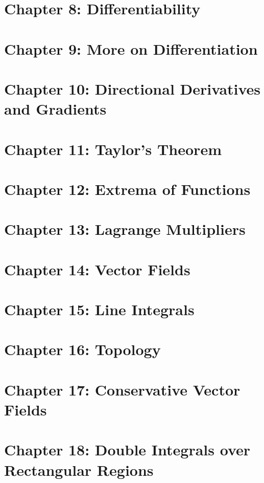 \documentclass{xourse}
\begin{document}
\part{Chapter 8: Differentiability}

\part{Chapter 9: More on Differentiation}

\part{Chapter 10: Directional Derivatives and Gradients}

\part{Chapter 11: Taylor's Theorem}

\part{Chapter 12: Extrema of Functions}

\part{Chapter 13: Lagrange Multipliers}

\part{Chapter 14: Vector Fields}

\part{Chapter 15: Line Integrals}

\part{Chapter 16: Topology}

\part{Chapter 17: Conservative Vector Fields}

\part{Chapter 18: Double Integrals over Rectangular Regions}
\end{document}
